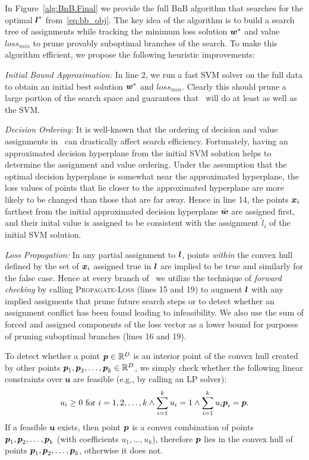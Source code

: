 In Figure~\ref{alg:BnB.Final} we provide the full BnB algorithm that
searches for the optimal $\boldsymbol{l}^*$ from~\eqref{eq:bb_obj}.  The key idea
of the algorithm is to build a search tree of assignments while
tracking the minimum loss solution $\boldsymbol{w}^*$ and value $loss_{min}$ to
prune provably suboptimal branches of the search.  To make this
algorithm efficient, we propose the following heuristic improvements:

\noindent \emph{Initial Bound Approximation:} In line 2, we run a fast
SVM solver on the full data to obtain an initial best solution $\boldsymbol{w}^*$
and $loss_{min}$.  Clearly this should prune a large portion of the
search space and guarantees that \BB\ will do at least as well as
the SVM.

\noindent \emph{Decision Ordering:} It is well-known that the ordering
of decision and value assignments in \BB\ can drastically affect
search efficiency.  Fortunately, having an approximated decision
hyperplane from the initial SVM solution helps to determine the
assignment and value ordering. Under the assumption that the optimal
decision hyperplane is somewhat near the approximated hyperplane, the
loss values of points that lie closer to the approximated hyperplane
are more likely to be changed than those that are far away.  Hence in
line 14, the points $\boldsymbol{x}_i$ farthest from the initial approximated
decision hyperplane $\tilde{\boldsymbol{w}}$ are assigned first, and their inital
value is assigned to be consistent with the assignment $\tilde{l}_i$
of the initial SVM solution.

\noindent \emph{Loss Propagation:} In any partial assignment to $\boldsymbol{l}$,
points \emph{within} the convex hull defined by the set of $\boldsymbol{x}_i$
assigned true in $\boldsymbol{l}$ are implied to be true and similarly for the
false case.  Hence at every branch of \BB\ we utilize the technique of
\emph{forward checking} by calling \textsc{Propagate-Loss} (lines 15
and 19) to augment $\boldsymbol{l}$ with any implied assigments that prune future
search steps or to detect whether an assignment conflict has been
found leading to infeasibility.  We also use the sum of forced and
assigned components of the loss vector as a lower bound for purposes
of pruning suboptimal branches (lines 16 and 19).

To detect whether a point $\boldsymbol{p} \in \mathbb{R}^D$ is an interior point
of the convex hull created by other points $\boldsymbol{p}_1,
\boldsymbol{p}_2, \dots, \boldsymbol{p}_k \in \mathbb{R}^D$, we simply check whether 
the following linear constraints over
$\mathbf{u}$ are feasible (e.g., by calling an LP solver):
$$
u_i \geq 0 \text{ for } i = 1,2, \dots, k \land \sum_{i=1}^k u_i = 1 \land \sum_{i=1}^k u_i \boldsymbol{p}_i = \boldsymbol{p}. 
$$ If a feasible $\mathbf{u}$ exists, then point $\boldsymbol{p}$
is a convex combination of points $\boldsymbol{p}_1, \boldsymbol{p}_2, \dots,
\boldsymbol{p}_k$ (with coefficients $u_1, \dots, u_k$), therefore $\boldsymbol{p}$ lies in the convex hull of points $\boldsymbol{p}_1, \boldsymbol{p}_2, \dots,
\boldsymbol{p}_k$, otherwise it does not.

